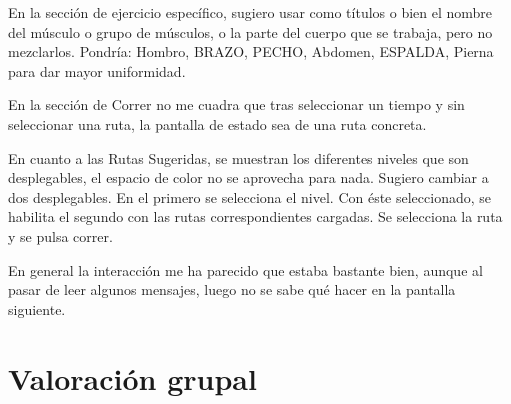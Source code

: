 \documentclass[a4paper]{article}
\begin{document}
En la sección de ejercicio específico, sugiero usar como títulos o bien el nombre del músculo o grupo de músculos, o la parte del cuerpo que se trabaja, pero no mezclarlos. Pondría: Hombro, BRAZO, PECHO, Abdomen, ESPALDA, Pierna para dar mayor uniformidad.

En la sección de Correr no me cuadra que tras seleccionar un tiempo y sin seleccionar una ruta, la pantalla de estado sea de una ruta concreta.

En cuanto a las Rutas Sugeridas, se muestran los diferentes niveles que son desplegables, el espacio de color no se aprovecha para nada. Sugiero cambiar a dos desplegables. En el primero se selecciona el nivel. Con éste seleccionado, se habilita el segundo con las rutas correspondientes cargadas. Se selecciona la ruta y se pulsa correr.

En general la interacción me ha parecido que estaba bastante bien, aunque al pasar de leer algunos mensajes, luego no se sabe qué hacer en la pantalla siguiente.

\section{Valoración grupal}
 
\end{document}
